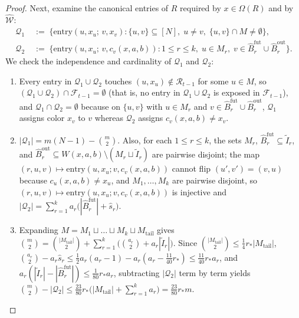 \documentclass[11pt]{article}
\theoremstyle{definition}
\theoremstyle{remark}
\begin{document}
\begin{proof}
Next, examine the canonical entries of $R$ required by $x \in \Omega(R)$ and by $\widehat{\mathcal{W}}$:
\begin{align*}
\mathcal{Q}_1 &\;:=\; \bigl\{\mathrm{entry}(u, x_u;\, v, x_v) : \{u, v\} \subseteq [N],\; u \ne v,\; \{u, v\} \cap M \ne \emptyset\bigr\}, \\
\mathcal{Q}_2 &\;:=\; \bigl\{\mathrm{entry}(u, x_u;\, v, c_v(x, a, b)) : 1 \le r \le k,\; u \in M_r,\; v \in \widehat{B}_r^{\mathrm{fut}} \cup \widehat{B}_r^{\mathrm{out}}\bigr\}.
\end{align*}
We check the independence and cardinality of $\mathcal{Q}_1$ and $\mathcal{Q}_2$:
\begin{enumerate}[label=(\roman*),nosep]
  \item Every entry in $\mathcal{Q}_1 \cup \mathcal{Q}_2$ touches $(u, x_u) \notin \mathcal{R}_{t-1}$ for some $u \in M$, so $(\mathcal{Q}_1 \cup \mathcal{Q}_2) \cap \mathcal{F}_{t-1} = \emptyset$ (that is, no entry in $\mathcal{Q}_1 \cup \mathcal{Q}_2$ is exposed in $\mathcal{F}_{t-1}$), and $\mathcal{Q}_1 \cap \mathcal{Q}_2 = \emptyset$ because on $\{u, v\}$ with $u \in M_r$ and $v \in \widehat{B}_r^{\mathrm{fut}} \cup \widehat{B}_r^{\mathrm{out}}$, $\mathcal{Q}_1$ assigns color $x_v$ to $v$ whereas $\mathcal{Q}_2$ assigns $c_v(x, a, b) \ne x_v$.
  \item $|\mathcal{Q}_1| = m(N - 1) - \binom{m}{2}$. Also, for each $1 \le r \le k$, the sets $M_r$, $\widehat{B}_r^{\mathrm{fut}} \subseteq \widetilde{I}_r$, and $\widehat{B}_r^{\mathrm{out}} \subseteq W(x, a, b) \setminus (M_r \sqcup \widetilde{I}_r)$ are pairwise disjoint; the map $(r, u, v) \mapsto \mathrm{entry}(u, x_u; v, c_v(x, a, b))$ cannot flip $(u', v') = (v, u)$ because $c_u(x, a, b) \ne x_u$, and $M_1, \dots, M_k$ are pairwise disjoint, so $(r, u, v) \mapsto \mathrm{entry}(u, x_u; v, c_v(x, a, b))$ is injective and $|\mathcal{Q}_2| = \sum_{r=1}^k a_r\bigl(|\widehat{B}_r^{\mathrm{fut}}| + \hat{s}_r\bigr)$.
  \item Expanding $M = M_1 \sqcup \dots \sqcup M_k \sqcup M_{\mathrm{tail}}$ gives $\binom{m}{2} = \binom{|M_{\mathrm{tail}}|}{2} + \sum_{r=1}^k \bigl(\binom{a_r}{2} + a_r |\widetilde{I}_r|\bigr)$. Since $\binom{|M_{\mathrm{tail}}|}{2} \le \frac{1}{4} r_* |M_{\mathrm{tail}}|$, $\binom{a_r}{2} - a_r \hat{s}_r \le \frac{1}{2} a_r(a_r - 1) - a_r(a_r - \frac{11}{40} r_*) \le \frac{11}{40} r_* a_r$, and $a_r(|\widetilde{I}_r| - |\widehat{B}_r^{\mathrm{fut}}|) \le \frac{1}{80} r_* a_r$, subtracting $|\mathcal{Q}_2|$ term by term yields $\binom{m}{2} - |\mathcal{Q}_2| \le \frac{23}{80} r_* \bigl(|M_{\mathrm{tail}}| + \sum_{r=1}^k a_r\bigr) = \frac{23}{80} r_* m$.

\end{enumerate}
\end{proof}
\end{document}
